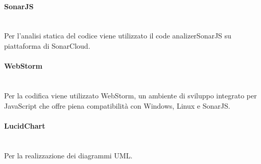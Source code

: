 \paragraph{SonarJS}\mbox{}\\ [1mm]
Per l'analisi statica del codice viene utilizzato il code analizer\glosp SonarJS su piattaforma di SonarCloud.
\paragraph{WebStorm}\mbox{}\\ [1mm]
Per la codifica viene utilizzato WebStorm, un ambiente di sviluppo integrato per JavaScript che offre piena compatibilità con Windows, Linux e SonarJS.
\paragraph{LucidChart}\mbox{}\\ [1mm]
Per la realizzazione dei diagrammi UML.	